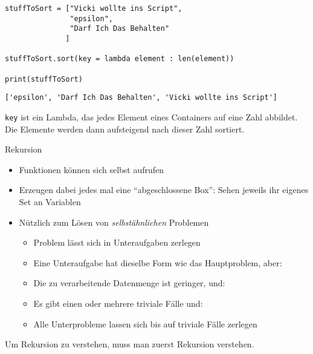 
\begin{frame}[fragile]
%
\begin{codebox}
\begin{verbatim}
stuffToSort = ["Vicki wollte ins Script",
               "epsilon", 
               "Darf Ich Das Behalten"
              ]

stuffToSort.sort(key = lambda element : len(element))

print(stuffToSort)
\end{verbatim}
\end{codebox}
%
\begin{cmdbox}
\begin{verbatim}
['epsilon', 'Darf Ich Das Behalten', 'Vicki wollte ins Script']
\end{verbatim}
\end{cmdbox}
%
\begin{hintbox}
\texttt{key} ist ein Lambda, das jedes Element eines Containers auf eine Zahl abbildet. Die Elemente werden dann aufsteigend nach dieser Zahl sortiert.
\end{hintbox}
%
\end{frame}


\begin{frame}{Rekursion}
%
\begin{itemize}
\item Funktionen können sich selbst aufrufen
\item Erzeugen dabei jedes mal eine \enquote{abgeschlossene Box}: Sehen jeweils ihr eigenes Set an Variablen
\item Nützlich zum Lösen von \emph{selbstähnlichen} Problemen
	\begin{itemize}
	\item Problem lässt sich in Unteraufgaben zerlegen
	\item Eine Unteraufgabe hat dieselbe Form wie das Hauptproblem, aber:
	\item Die zu verarbeitende Datenmenge ist geringer, und:
	\item Es gibt einen oder mehrere triviale Fälle und:
	\item Alle Unterprobleme lassen sich bis auf triviale Fälle zerlegen
	\end{itemize}
\end{itemize}
%
\begin{hintbox}
Um Rekursion zu verstehen, muss man zuerst Rekursion verstehen.
\end{hintbox}
%
\end{frame}


